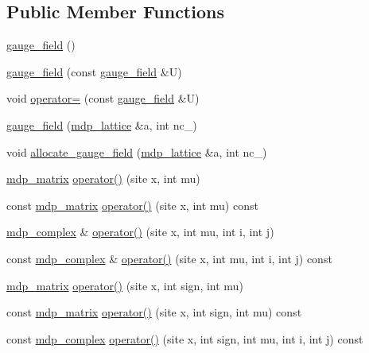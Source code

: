\subsection*{Public Member Functions}
\begin{DoxyCompactItemize}
\item 
\hyperlink{classgauge__field_abdb50dfc413d1c22904a0ea38fc72e34}{gauge\_\-field} ()
\item 
\hyperlink{classgauge__field_a0500e23c8bd48d78650235e6ae668ab0}{gauge\_\-field} (const \hyperlink{classgauge__field}{gauge\_\-field} \&U)
\item 
void \hyperlink{classgauge__field_a1006054965a512e4dd06ca8c0b5c5d28}{operator=} (const \hyperlink{classgauge__field}{gauge\_\-field} \&U)
\item 
\hyperlink{classgauge__field_adcfa1a4c412dc26688307e95f3ed42b5}{gauge\_\-field} (\hyperlink{classmdp__lattice}{mdp\_\-lattice} \&a, int nc\_\-)
\item 
void \hyperlink{classgauge__field_ac7af990c989c01f0254a5454fc365dd7}{allocate\_\-gauge\_\-field} (\hyperlink{classmdp__lattice}{mdp\_\-lattice} \&a, int nc\_\-)
\item 
\hyperlink{classmdp__matrix}{mdp\_\-matrix} \hyperlink{classgauge__field_a765260519dece4a4ffafa338cbee22ae}{operator()} (site x, int mu)
\item 
const \hyperlink{classmdp__matrix}{mdp\_\-matrix} \hyperlink{classgauge__field_a8bbf9acb59886d8fcd08973476f224f6}{operator()} (site x, int mu) const 
\item 
\hyperlink{classmdp__complex}{mdp\_\-complex} \& \hyperlink{classgauge__field_a60a42ee4e59ad13f7bab46ba6f4ef2d9}{operator()} (site x, int mu, int i, int j)
\item 
const \hyperlink{classmdp__complex}{mdp\_\-complex} \& \hyperlink{classgauge__field_a3d76d90e8a6f39b0897cf463d6d8d049}{operator()} (site x, int mu, int i, int j) const 
\item 
\hyperlink{classmdp__matrix}{mdp\_\-matrix} \hyperlink{classgauge__field_a8d68963fa439cf58c3ac16c043523010}{operator()} (site x, int sign, int mu)
\item 
const \hyperlink{classmdp__matrix}{mdp\_\-matrix} \hyperlink{classgauge__field_afc4082b84abc10e1be05168c9898fddd}{operator()} (site x, int sign, int mu) const 
\item 
const \hyperlink{classmdp__complex}{mdp\_\-complex} \hyperlink{classgauge__field_a9dd484a3ca793d5e0376bbe2c2cd8995}{operator()} (site x, int sign, int mu, int i, int j) const 
\end{DoxyCompactItemize}
